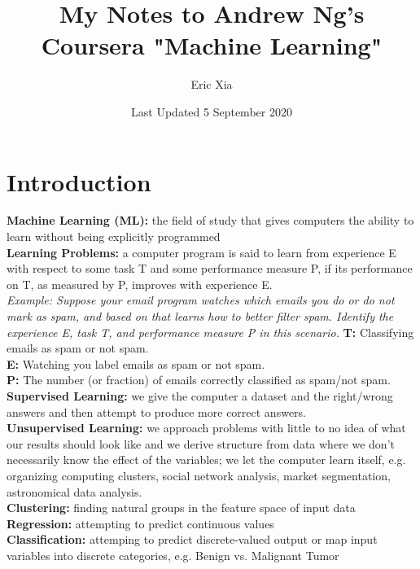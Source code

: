 \documentclass{article}
\title{My Notes to Andrew Ng's Coursera "Machine Learning"}
\author{Eric Xia}
\date{Last Updated 5 September 2020}
\begin{document}
    \maketitle
    \tableofcontents
    \pagebreak

    \section{Introduction}
        \textbf{Machine Learning (ML):} the field of study that gives computers the ability to learn without
        being explicitly programmed \\
        \noindent \textbf{Learning Problems:} a computer program is said to learn from experience E with respect to some
        task T and some performance measure P, if its performance on T, as measured by P, improves with
        experience E. \\

        \noindent \textit{Example: Suppose your email program watches which emails you do or do not mark as spam, and based on
        that learns how to better filter spam. Identify the experience E, task T, and performance measure P
        in this scenario.}
        \noindent \textbf{T:} Classifying emails as spam or not spam. \\
        \noindent \textbf{E:} Watching you label emails as spam or not spam. \\
        \noindent \textbf{P:} The number (or fraction) of emails correctly classified as spam/not spam. \\

        \noindent \textbf{Supervised Learning:} we give the computer a dataset and the right/wrong answers
        and then attempt to produce more correct answers. \\
        \noindent \textbf{Unsupervised Learning:} we approach problems with little to no idea of what our
        results should look like and we derive structure from data where we don't necessarily know the effect
        of the variables; we let the computer learn itself, e.g. organizing computing clusters, social network
        analysis, market segmentation, astronomical data analysis. \\
        
        \noindent \textbf{Clustering:} finding natural groups in the feature space of input data \\
        \noindent \textbf{Regression:} attempting to predict continuous values \\
        \noindent \textbf{Classification:} attemping to predict discrete-valued output or map input variables
        into discrete categories, e.g. Benign vs. Malignant Tumor \\
\end{document}
